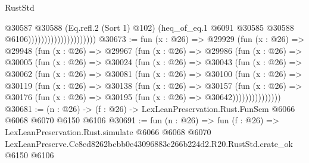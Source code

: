\begin{lexlean}{RustStd}
\begin{coremodule}
                                          @30587
                                            @30588
                                            (Eq.refl.{2} (Sort 1) @102)
                                            (heq_of_eq.{1}
                                              @6091
                                              @30585
                                              @30588
                                              @6106)))))))))))))))))))))
@30673 := fun (x : @26) =>
  @29929
    (fun (x : @26) =>
    @29948
      (fun (x : @26) =>
      @29967
        (fun (x : @26) =>
        @29986
          (fun (x : @26) =>
          @30005
            (fun (x : @26) =>
            @30024
              (fun (x : @26) =>
              @30043
                (fun (x : @26) =>
                @30062
                  (fun (x : @26) =>
                  @30081
                    (fun (x : @26) =>
                    @30100
                      (fun (x : @26) =>
                      @30119
                        (fun (x : @26) =>
                        @30138
                          (fun (x : @26) =>
                          @30157
                            (fun (x : @26) =>
                            @30176 (fun (x : @26) => @30195 (fun (x : @26) => @30642)))))))))))))))
@30681 := (n : @26) -> (f : @26) -> LexLeanPreservation.Rust.FunSem @6066 @6068 @6070 @6150 @6106
@30691 := fun (n : @26) =>
  fun (f : @26) =>
  LexLeanPreservation.Rust.simulate
    @6066
    @6068
    @6070
    LexLeanPreserve.Cc8ed8262bcbb0e43096883c266b224d2.R20.RustStd.crate_ok
    @6150
    @6106
\end{coremodule}
\end{lexlean}
